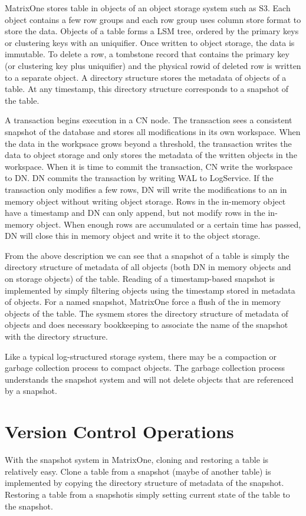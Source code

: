 \documentclass[sigconf,nonacm]{acmart} %
\begin{document}
MatrixOne stores table in objects of an object storage system such as S3.  
Each object contains a few row groups and each row group uses column store format to store 
the data.  Objects of a table forms a LSM tree, ordered by the primary keys 
or clustering keys with an uniquifier.  
Once written to object storage, the data is immutable.  
To delete a row, a tombstone record that 
contains the primary key (or clustering key plus uniquifier) and the physical rowid of 
deleted row is written to a separate object.
A directory structure stores the metadata of objects of a table.  At any timestamp, this
directory structure corresponds to a snapshot of the table.

A transaction begins execution in a CN node.  The transaction sees a consistent snapshot
of the database and stores all modifications in its own workspace.  When the data in the
workpsace grows beyond a threshold, the transaction writes the data to object storage
and only stores the metadata of the written objects in the workspace.  When it is time to 
commit the transaction, CN write the workspace to DN.  DN commits the transaction by 
writing WAL to LogService.  If the transaction only modifies a few rows, DN will write the 
modifications to an in memory object without writing object storage.  Rows in the in-memory
object have a timestamp and DN can only append, but not modify rows in the in-memory 
object.  When enough rows are accumulated or a certain time has passed, DN will close 
this in memory object and write it to the object storage.  

From the above description we can see that a snapshot of a table is simply the directory 
structure of metadata of all objects (both DN in memory objects and on storage objects)
of the table.  Reading of a timestamp-based snapshot is implemented by simply filtering 
objects using the timestamp stored in metadata of objects.  For a named snapshot, MatrixOne
force a flush of the in memory objects of the table.  The sysmem stores the directory 
structure of metadata of objects and does necessary bookkeeping to associate the name 
of the snapshot with the directory structure.

Like a typical log-structured storage system, there may be a compaction
or garbage collection process to compact objects.  The garbage collection process
understands the snapshot system and will not delete objects that are referenced 
by a snapshot.

\section{Version Control Operations}
With the snapshot system in MatrixOne, cloning and restoring a table is relatively 
easy. Clone a table from a snapshot (maybe of another table) is implemented by copying 
the directory structure of metadata of the snapshot. Restoring a table from a 
snapshotis simply setting current state of the table to the snapshot.
\end{document}
